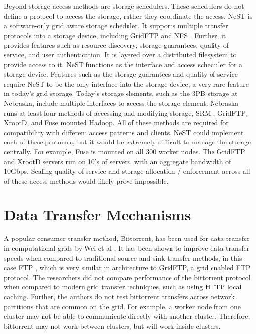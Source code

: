 Beyond storage access methods are storage schedulers.  These schedulers do not define a protocol to access the storage, rather they coordinate the access.  NeST \cite{bent2002flexibility} is a software-only grid aware storage scheduler.  It supports multiple transfer protocols into a storage device, including GridFTP \cite{allcock2005globus} and NFS \cite{walsh1985overview}.  Further, it provides features such as resource discovery, storage guarantees, quality of service, and user authentication.  It is layered over a distributed filesystem to provide access to it.  NeST functions as the interface and access scheduler for a storage device.  Features such as the storage guarantees and quality of service require NeST to be the only interface into the storage device, a very rare feature in today's grid storage.  Today's storage elements, such as the 3PB storage at Nebraska, include multiple interfaces to access the storage element.  Nebraska runs at least four \cite{attebury2009hadoop} methods of accessing and modifying storage, SRM \cite{shoshani2002storage}, GridFTP, XrootD, and Fuse \cite{szeredi2010fuse} mounted Hadoop.  All of these methods are required for compatibility with different access patterns and clients.  NeST could implement each of these protocols, but it would be extremely difficult to manage the storage centrally.  For example, Fuse is mounted on all 300 worker nodes.  The GridFTP and XrootD servers run on 10's of servers, with an aggregate bandwidth of 10Gbps.  Scaling quality of service and storage allocation / enforcement across all of these access methods would likely prove impossible.



\section{Data Transfer Mechanisms}

A popular consumer transfer method, Bittorrent, has been used for data transfer in computational grids by Wei et al \cite{wei2005collaborative, wei2005scheduling, wei2007towards}.  It has been shown to improve data transfer speeds when compared to traditional source and sink transfer methods, in this case FTP \cite{postel1985file}, which is very similar in architecture to GridFTP, a grid enabled FTP protocol.  The researchers did not compare performance of the bittorrent protocol when compared to modern grid transfer techniques, such as using HTTP local caching.  Further, the authors do not test bittorrent transfers across network partitions that are common on the grid.  For example, a worker node from one cluster may not be able to communicate directly with another cluster.  Therefore, bittorrent may not work between clusters, but will work inside clusters.

